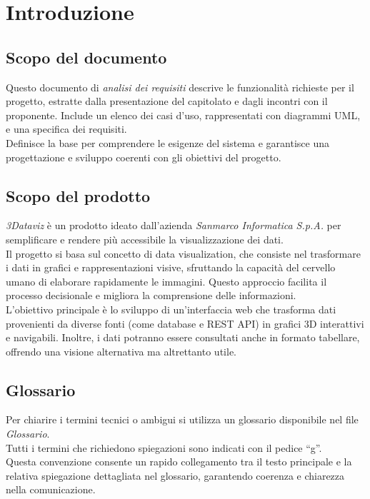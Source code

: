 \section{Introduzione}
\subsection{Scopo del documento}
Questo documento di \textit{analisi dei requisiti} descrive le funzionalità richieste per il progetto, estratte dalla presentazione del capitolato e dagli incontri con il proponente. 
Include un elenco dei casi d'uso, rappresentati con diagrammi UML, e una specifica dei requisiti.\\
Definisce la base per comprendere le esigenze del sistema e garantisce una progettazione e sviluppo coerenti con gli obiettivi del progetto.

\subsection{Scopo del prodotto}
\textit{3Dataviz} è un prodotto ideato dall'azienda \textit{Sanmarco Informatica S.p.A.} per semplificare e rendere più accessibile la visualizzazione dei dati.\\
Il progetto si basa sul concetto di data visualization, che consiste nel trasformare i dati in grafici e rappresentazioni visive, sfruttando la capacità del cervello umano di elaborare rapidamente le immagini. 
Questo approccio facilita il processo decisionale e migliora la comprensione delle informazioni.\\
L’obiettivo principale è lo sviluppo di un’interfaccia web che trasforma dati provenienti da diverse fonti (come database e REST API) in grafici 3D interattivi e navigabili. 
Inoltre, i dati potranno essere consultati anche in formato tabellare, offrendo una visione alternativa ma altrettanto utile.  

\subsection{Glossario}
Per chiarire i termini tecnici o ambigui si utilizza un glossario disponibile nel file \textit{Glossario}.\\
Tutti i termini che richiedono spiegazioni sono indicati con il pedice “g”. \\
Questa convenzione consente un rapido collegamento tra il testo principale e la relativa spiegazione dettagliata nel glossario, garantendo coerenza e chiarezza nella comunicazione.

